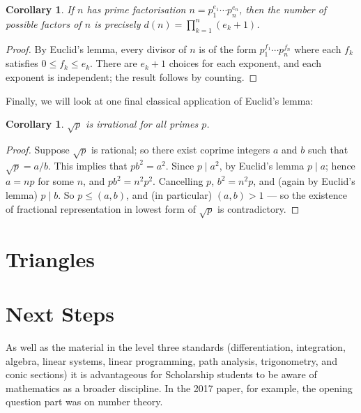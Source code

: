 \documentclass[a4paper,leqno]{article}
\numberwithin{equation}{section}
\newtheorem{cor}[equation]{Corollary}
\theoremstyle{definition}
\theoremstyle{remark}
\begin{document}
\begin{cor}
  If $ n $ has prime factorisation $ n = p_1^{e_1} \cdots p_n^{e_n} $, then the number of possible factors of $ n $ is precisely $ d(n) = \prod_{k = 1}^n (e_k + 1) $.
\end{cor}
\begin{proof}
  By Euclid's lemma, every divisor of $ n $ is of the form $ p_1^{f_1} \cdots p_n^{f_n} $ where each $ f_k $ satisfies $ 0 \leq f_k \leq e_k $. There
  are $ e_k + 1 $ choices for each exponent, and each exponent is independent; the result follows by counting.
\end{proof}

Finally, we will look at one final classical application of Euclid's lemma:
\begin{cor}
  $ \sqrt{p} $ is irrational for all primes $ p $.
\end{cor}
\begin{proof}
  Suppose $ \sqrt{p} $ is rational; so there exist coprime integers $ a $ and $ b $ such that $ \sqrt{p} = a/b $. This implies
  that $ pb^2 = a^2 $. Since $ p \mid a^2 $, by Euclid's lemma $ p \mid a $; hence $ a = np $ for some $ n $, and $ pb^2 = n^2 p^2 $.
  Cancelling $ p $, $ b^2 = n^2 p $, and (again by Euclid's lemma) $ p \mid b $. So $ p \leq (a,b) $, and (in particular) $ (a,b) > 1 $ ---
  so the existence of fractional representation in lowest form of $ \sqrt{p} $ is contradictory.
\end{proof}

\section{Triangles}

\section{Next Steps}
As well as the material in the level three standards (differentiation, integration, algebra, linear systems, linear programming, path analysis,
trigonometry, and conic sections) it is advantageous for Scholarship students to be aware of mathematics as a broader discipline. In the 2017
paper, for example, the opening question part was on number theory.
\end{document}
